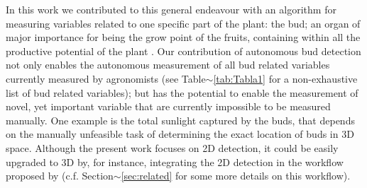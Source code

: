 \documentclass[a4paper,authoryear,review]{elsarticle}
\begin{document}
%
In this work we contributed to this general endeavour with an algorithm for measuring variables related to one specific part of the plant: the bud; an organ of major importance for being the grow point of the fruits, containing within all the productive potential of the plant \citep{may2000bud}. Our contribution of  autonomous bud detection not only enables the autonomous measurement of all bud related variables currently measured by agronomists (see Table$\sim$\ref{tab:Tabla1} for a non-exhaustive list of bud related variables); but has the potential to enable the measurement of novel, yet important variable  that are currently impossible to be measured manually. One example is the total sunlight captured by the buds, that depends on the manually unfeasible task of determining the exact location of buds in 3D space.  Although the present work focuses on 2D detection, it could be easily upgraded to 3D by, for instance, integrating the 2D detection in the workflow proposed by \cite{diaz2018grapevine} (c.f. Section$\sim$\ref{sec:related} for some more details on this workflow).
\end{document}
